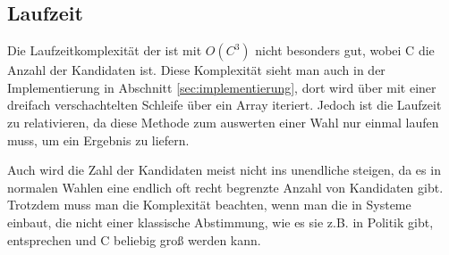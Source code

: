 

\subsection{Laufzeit}
\label{sec:Laufzeit}
Die Laufzeitkomplexität der \schulze ist mit $O(C^3)$ nicht besonders gut, wobei C die Anzahl der Kandidaten ist. Diese Komplexität sieht man auch in der Implementierung in Abschnitt \ref{sec:implementierung}, dort wird über mit einer dreifach verschachtelten Schleife über ein Array iteriert. Jedoch ist die Laufzeit zu relativieren, da diese Methode zum auswerten einer Wahl nur einmal laufen muss, um ein Ergebnis zu liefern.

Auch wird die Zahl der Kandidaten meist nicht ins unendliche steigen, da es in normalen Wahlen eine endlich oft recht begrenzte Anzahl von Kandidaten gibt. Trotzdem muss man die Komplexität beachten, wenn man die \schulze in Systeme einbaut, die nicht einer klassische Abstimmung, wie es sie z.B. in Politik gibt, entsprechen und C beliebig groß werden kann.


